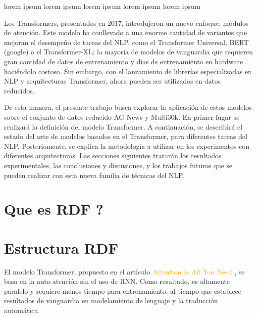 \documentclass[conference]{IEEEtran}
\begin{document}
lorem ipsum
lorem ipsum
lorem ipsum
lorem ipsum
lorem ipsum


\vspace{0.2cm}

Los Transformers, presentados en 2017, introdujeron un nuevo enfoque: m\'odulos de atenci\'on. Este modelo ha conllevado a una enorme cantidad de variantes que mejoran el desempe\~no de tareas del NLP, como el Transformer Universal, BERT (google) o el Transformer-XL; la mayor\'ia de modelos de vanguardia que requieren gran cantidad de datos de entrenamiento y d\'ias de entrenamiento en hardware haci\'endolo costoso. Sin embargo, con el lanzamiento de librer\'ias especializadas en NLP y arquitecturas Transformer, ahora pueden ser utilizados en datos reducidos.

\vspace{0.2cm}

De esta manera, el presente trabajo busca explorar la aplicación de estos modelos sobre el conjunto de datos reducido AG News y Multi30k. En primer lugar se realizar\'a la definici\'on del modelo Transformer. A continuaci\'on, se describir\'a el estado del arte de modelos basados en el Transformer, para diferentes tareas del NLP. Posteriomente, se explica la metodolog\'ia a utilizar en los experimentos con diferentes arquitecturas. Las secciones siguientes tratar\'an los resultados experimentales, las conclusiones y discusiones, y los trabajos futuros que se pueden realizar con esta nueva familia de t\'ecnicas del NLP.


\vspace{0.2cm}

\section{Que es RDF ?}

\section{Estructura RDF}



El modelo Transformer, propuesto en el art\'iculo \textcolor{orange}{Attention Is All You Need} \cite{b1}, se basa en la auto-atenci\'on sin el uso de RNN. Como resultado, es altamente paralelo y requiere menos tiempo para entrenamiento, al tiempo que establece resultados de vanguardia en modelamiento de lenguaje y la traducci\'on autom\'atica.


\vspace{0.2cm}
\end{document}
